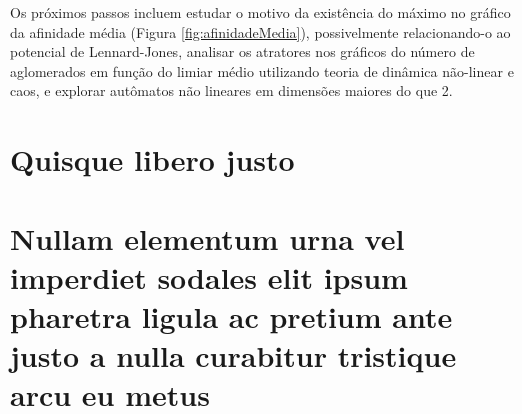 \documentclass[
	12pt,				%
	openright,			%
	twoside,			%
	a4paper,			%
	english,			%
	french,				%
	spanish,			%
	brazil				%
	]{abntex2}
\begin{document}
Os próximos passos incluem estudar o motivo da existência do máximo no gráfico da afinidade média (Figura \ref{fig:afinidadeMedia}), possivelmente relacionando-o ao potencial de Lennard-Jones, analisar os atratores nos gráficos do número de aglomerados em função do limiar médio utilizando teoria de dinâmica não-linear e caos, e explorar autômatos não lineares em dimensões maiores do que 2.

\postextual



%
%


\begin{apendicesenv}

\partapendices

\chapter{Quisque libero justo}

\lipsum[50]

\chapter{Nullam elementum urna vel imperdiet sodales elit ipsum pharetra ligula
ac pretium ante justo a nulla curabitur tristique arcu eu metus}
\lipsum[55-57]

\end{apendicesenv}
\end{document}
